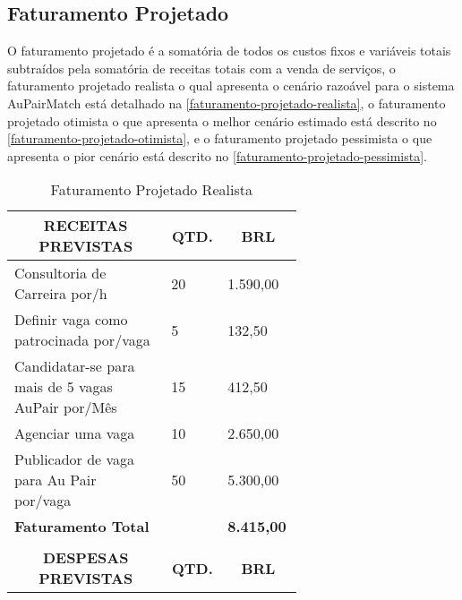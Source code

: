 \subsection{Faturamento Projetado}

O faturamento projetado é a somatória de todos os custos fixos e variáveis totais subtraídos pela somatória de receitas totais com a venda de serviços, o faturamento projetado realista o qual apresenta o cenário razoável para o sistema AuPairMatch está detalhado na \autoref{faturamento-projetado-realista}, o faturamento projetado otimista o que apresenta o melhor cenário estimado está descrito no \autoref{faturamento-projetado-otimista}, e o faturamento projetado pessimista o que apresenta o pior cenário está descrito no \autoref{faturamento-projetado-pessimista}.

\begin{enumerate}
    \begin{table}[H]
    \caption{Faturamento Projetado Realista}
    \label{faturamento-projetado-realista}
    	\centering\footnotesize
        \begin{tabular}{|p{0.50\linewidth} | p{0.04\linewidth} |  p{0.10\linewidth} |}  \hline

        \multicolumn{1}{|c|}{\textbf{RECEITAS PREVISTAS}} &
        \multicolumn{1}{|c|}{\textbf{QTD.}} &
        \multicolumn{1}{|c|}{\textbf{BRL}} \\ \hline


    Consultoria de Carreira por/h   & 20 & 1.590,00         \\ \hline
    Definir vaga como patrocinada por/vaga  & 5 & 132,50      \\ \hline
    Candidatar-se para mais de 5 vagas AuPair por/Mês     &  15 & 412,50     \\ \hline
    Agenciar uma vaga             &  10  & 2.650,00          \\ \hline
    Publicador de vaga para Au Pair por/vaga     & 50  &   5.300,00     \\ \hline
    {\textbf{Faturamento Total}}   &   &   {\textbf{8.415,00}}           \\  \hline 


    &   &        \\ \hline
    \multicolumn{1}{|c|}{\textbf{DESPESAS PREVISTAS}} &
    \multicolumn{1}{|c|}{\textbf{QTD.}} &
    \multicolumn{1}{|c|}{\textbf{BRL}} \\ \hline


\end{tabular}
\end{table}
\end{enumerate}
